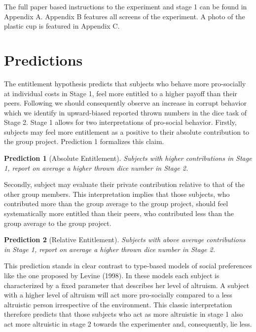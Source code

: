 \documentclass[12pt, a4paper]{article}
\newtheorem{prediction}{Prediction}
\begin{document}
The full paper based instructions to the experiment and stage 1 can be found in Appendix A. Appendix B features all screens of the experiment. A photo of the plastic cup is featured in Appendix C.

\section{Predictions}

The entitlement hypothesis predicts that subjects who behave more pro-socially at individual costs in Stage 1, feel more entitled to a higher payoff than their peers. Following \citet{Banerjee2016On} we should consequently observe an increase in corrupt behavior which we identify in upward-biased reported thrown numbers in the dice task of Stage 2. Stage 1 allows for two interpretations of pro-social behavior. Firstly, subjects may feel more entitlement as a positive to their absolute contribution to the group project. Prediction 1 formalizes this claim.

\begin{prediction}[Absolute Entitlement]
    Subjects with higher contributions in Stage 1, report on average a higher thrown dice number in Stage 2.
\end{prediction}


Secondly, subject may evaluate their private contribution relative to that of the other group members. This interpretation implies that those subjects, who contributed more than the group average to the group project, should feel systematically more entitled than their peers, who contributed less than the group average to the group project.

\begin{prediction}[Relative Entitlement]
    Subjects with above average contributions in Stage 1, report on average a higher thrown dice number in Stage 2.
\end{prediction}

This prediction stands in clear contrast to type-based models of social preferences like the one proposed by Levine (1998). In these models each subject is characterized by a fixed parameter that describes her level of altruism. A subject with a higher level of altruism will act more pro-socially compared to a less altruistic person irrespective of the environment. This classic interpretation therefore predicts that those subjects who act as more altruistic in stage 1 also act more altruistic in stage 2 towards the experimenter and, consequently, lie less.
\end{document}
